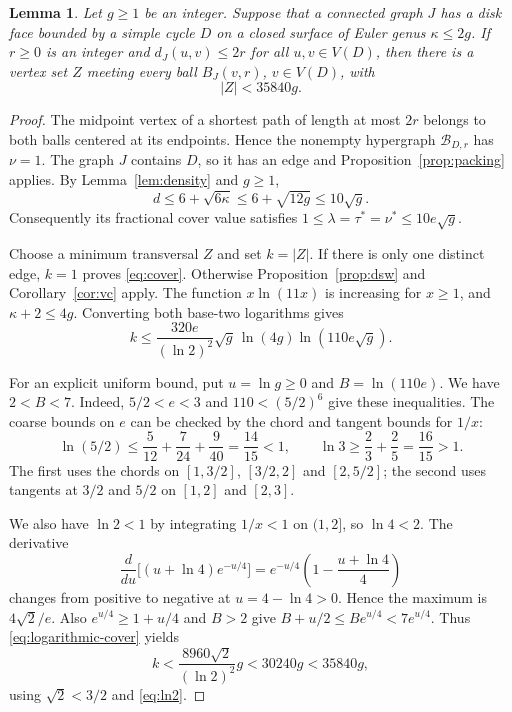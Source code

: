 \documentclass[11pt]{article}
\newtheorem{lemma}[theorem]{Lemma}
\theoremstyle{remark}
\begin{document}
\begin{lemma}\label{lem:cover}
Let $g\ge1$ be an integer. Suppose that a connected graph $J$ has a disk
face bounded by a simple cycle $D$ on a closed surface of Euler genus
$\kappa\le2g$. If $r\ge0$ is an integer and
$d_J(u,v)\le2r$ for all $u,v\in V(D)$, then there is a vertex set $Z$
meeting every ball $B_J(v,r)$, $v\in V(D)$, with
\begin{equation}\label{eq:cover}
|Z|<35840g.
\end{equation}
\end{lemma}
\begin{proof}
The midpoint vertex of a shortest path of length at most $2r$ belongs to
both balls centered at its endpoints. Hence the nonempty hypergraph
$\mathcal B_{D,r}$ has $\nu=1$. The graph $J$ contains $D$, so it has an
edge and Proposition~\ref{prop:packing} applies.
By Lemma~\ref{lem:density} and $g\ge1$,
\[
d\le6+\sqrt{6\kappa}\le6+\sqrt{12g}\le10\sqrt g.
\]
Consequently its fractional cover value satisfies
$1\le\lambda=\tau^*=\nu^*\le10e\sqrt g$.

Choose a minimum transversal $Z$ and set $k=|Z|$.
If there is only one distinct edge, $k=1$ proves \eqref{eq:cover}.
Otherwise Proposition~\ref{prop:dsw} and Corollary~\ref{cor:vc} apply.
The function $x\ln(11x)$ is increasing for $x\ge1$, and $\kappa+2\le4g$.
Converting both base-two logarithms gives
\begin{equation}\label{eq:logarithmic-cover}
k\le\frac{320e}{(\ln2)^2}\sqrt g\,\ln(4g)\ln(110e\sqrt g).
\end{equation}

For an explicit uniform bound, put $u=\ln g\ge0$ and $B=\ln(110e)$.
We have $2<B<7$. Indeed, $5/2<e<3$ and $110<(5/2)^6$ give these
inequalities. The coarse bounds on $e$ can be checked by the chord and
tangent bounds for $1/x$:
\[
\ln(5/2)\le\frac5{12}+\frac7{24}+\frac9{40}
 =\frac{14}{15}<1,\qquad
\ln3\ge\frac23+\frac25=\frac{16}{15}>1.
\]
The first uses the chords on $[1,3/2]$, $[3/2,2]$ and $[2,5/2]$;
the second uses tangents at $3/2$ and $5/2$ on $[1,2]$ and $[2,3]$.

We also have $\ln2<1$ by integrating $1/x<1$ on $(1,2]$, so $\ln4<2$.
The derivative
\[
\frac{d}{du}\bigl[(u+\ln4)e^{-u/4}\bigr]
 =e^{-u/4}\left(1-\frac{u+\ln4}{4}\right)
\]
changes from positive to negative at $u=4-\ln4>0$. Hence the maximum
is $4\sqrt2/e$. Also $e^{u/4}\ge1+u/4$ and $B>2$
give $B+u/2\le B e^{u/4}<7e^{u/4}$. Thus \eqref{eq:logarithmic-cover} yields
\[
k<\frac{8960\sqrt2}{(\ln2)^2}g
 <30240g<35840g,
\]
using $\sqrt2<3/2$ and \eqref{eq:ln2}.
\end{proof}
\end{document}
